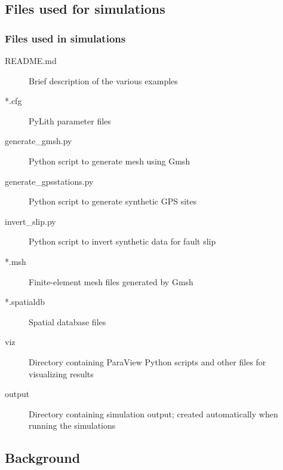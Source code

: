\documentclass[aspectratio=169]{beamer}
\begin{document}
\subsection{Files used for simulations}

\begin{frame}
  \frametitle{Files used in simulations}

  \begin{description}
  \item[README.md] Brief description of the various examples
  \item[*.cfg] PyLith parameter files
  \item[generate\_gmsh.py] Python script to generate mesh using Gmsh
  \item[generate\_gpsstations.py] Python script to generate synthetic
    GPS sites
  \item[invert\_slip.py] Python script to invert synthetic data for
    fault slip
  \item[*.msh] Finite-element mesh files generated by Gmsh
  \item[*.spatialdb] Spatial database files
  \item[viz] Directory containing ParaView Python scripts and other files for visualizing results
  \item[output] Directory containing simulation output; created automatically when running the simulations
  \end{description}

\end{frame}

\subsection{Background}
\end{document}
